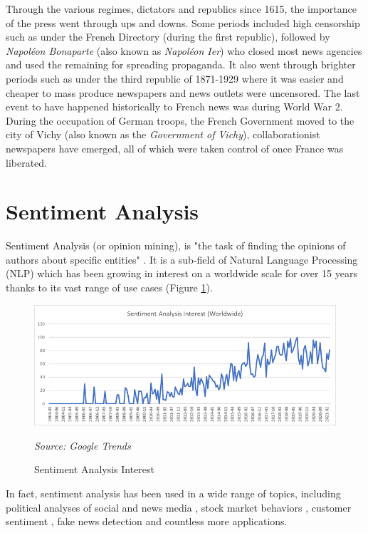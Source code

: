 Through the various regimes, dictators and republics since 1615, the importance of the press went through ups and downs. Some periods included high censorship such as under the French Directory (during the first republic), followed by \emph{Napoléon Bonaparte} (also known as \emph{Napoléon Ier}) who closed most news agencies and used the remaining for spreading propaganda. It also went through brighter periods such as under the third republic of 1871-1929 where it was easier and cheaper to mass produce newspapers and news outlets were uncensored. The last event to have happened historically to French news was during World War 2. During the occupation of German troops, the French Government moved to the city of Vichy (also known as the \emph{Government of Vichy}), collaborationist newspapers have emerged, all of which were taken control of once France was liberated.

\section{Sentiment Analysis}\label{Sentiment Analysis}

Sentiment Analysis (or opinion mining), is "the task of finding the opinions of authors about specific entities" \citep{feldman2013techniques}. It is a sub-field of Natural Language Processing (NLP) which has been growing in interest on a worldwide scale for over 15 years thanks to its vast range of use cases (Figure \ref{fig:sentiment interest}).

\begin{figure}[h!]
      \centering
      \includegraphics[scale=0.65]{lit_review/sentiment_analysis_interest.png}
      \caption{Sentiment Analysis Interest}
      \label{fig:sentiment interest}
      \emph{Source: Google Trends}
\end{figure}

In fact, sentiment analysis has been used in a wide range of topics, including political analyses of social and news media \citep{ahmad2011new}, stock market behaviors \citep{rao2012analyzing,li2014news}, customer sentiment \citep{cambria2013new,mouthami2013sentiment}, fake news detection \citep{bhutani2019fake} and countless more applications.

